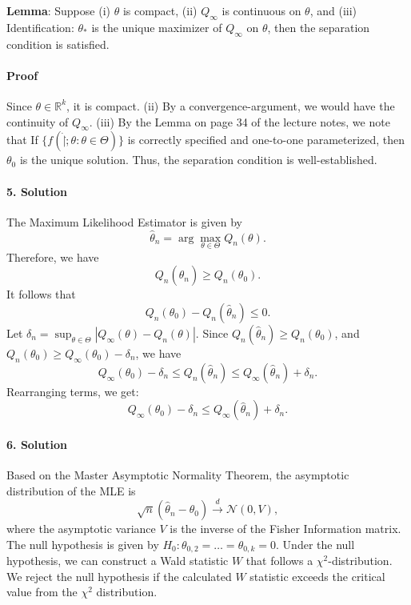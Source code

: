 \documentclass[11pt]{article}
\theoremstyle{definition}
\theoremstyle{boldtitle} %
\numberwithin{equation}{section}
\numberwithin{figure}{section}
\numberwithin{table}{section}
\begin{document}
\noindent \textbf{Lemma}: Suppose (i) $\theta$ is compact, (ii) $Q_\infty$ is continuous on $\theta$, 
and (iii) Identification: $\theta_*$ is the unique maximizer of $Q_\infty$ on $\theta$,
then the separation condition is satisfied. 
\vspace{-3mm}
\paragraph{Proof} Since $\theta \in \mathbb{R}^k$, it is compact. 
(ii) By a convergence-argument, we would have the continuity of $Q_\infty$.
(iii) By the Lemma on page 34 of the lecture notes, we note that 
If $\{f(\dot | \dot; \theta: \theta \in \Theta)\}$ is correctly specified and one-to-one parameterized,
then $\theta_0$ is the unique solution.
Thus, the separation condition is well-established.


\paragraph{5. Solution}

The Maximum Likelihood Estimator is given by
\[
\hat{\theta}_n = \arg\max_{\theta \in \Theta} Q_n(\theta).
\]
Therefore, we have
\[
Q_n(\hat{\theta}_n) \geq Q_n(\theta_0).
\]
It follows that
\[
Q_n(\theta_0) - Q_n(\hat{\theta}_n) \leq 0.
\]
Let $\delta_n = \sup_{\theta \in \Theta} |Q_\infty(\theta) - Q_n(\theta)|$.  
Since $Q_n(\hat{\theta}_n) \geq Q_n(\theta_0)$,
and $Q_n(\theta_0) \geq Q_\infty(\theta_0) - \delta_n$,
we have
\[
Q_\infty(\theta_0) - \delta_n \leq Q_n(\hat{\theta}_n) \leq Q_\infty(\hat{\theta}_n) + \delta_n.
\]
Rearranging terms, we get:
\[
Q_\infty(\theta_0) - \delta_n \leq Q_\infty(\hat{\theta}_n) + \delta_n.
\]

\paragraph{6. Solution}
Based on the Master Asymptotic Normality Theorem, 
the asymptotic distribution of the MLE is 
\[
\sqrt{n}(\hat{\theta}_n - \theta_0) \xrightarrow{d} \mathcal{N}(0, V),
\]
where the asymptotic variance $V$ is the inverse of the Fisher Information matrix. 
The null hypothesis is given by $H_0: \theta_{0,2} = \dots = \theta_{0,k} = 0$. 
Under the null hypothesis, 
we can construct a Wald statistic $W$ that follows a $\chi^2$-distribution. 
We reject the null hypothesis if the calculated $W$ statistic 
exceeds the critical value from the $\chi^2$ distribution.


\end{document}
